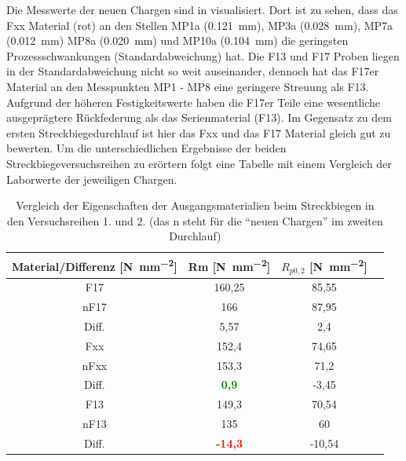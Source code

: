 \documentclass[12pt,a4paper,parskip]{scrartcl}
\begin{document}
Die Messwerte der neuen Chargen sind in  visualisiert. Dort ist zu sehen, dass das Fxx Material (rot) an den Stellen MP1a (\SI{0,121}{\milli\meter}), MP3a (\SI{0,028}{\milli\metre}),  MP7a (\SI{0,012}{\milli\meter}) MP8a (\SI{0,020}{\milli\meter}) und MP10a (\SI{0,104}{\milli\meter}) die geringsten Prozessschwankungen (Standardabweichung) hat.  Die F13 und F17 Proben liegen in der Standardabweichung nicht so weit auseinander, dennoch hat das F17er Material an den Messpunkten MP1 - MP8 eine geringere Streuung als F13. Aufgrund der höheren Festigkeitswerte haben die F17er Teile eine wesentliche ausgeprägtere Rückfederung als das Serienmaterial (F13). Im Gegensatz zu dem ersten Streckbiegedurchlauf ist hier das Fxx und das F17 Material gleich gut zu bewerten. Um die unterschiedlichen Ergebnisse der beiden Streckbiegeversuchsreihen zu erörtern folgt eine Tabelle mit einem Vergleich der Laborwerte der jeweiligen Chargen. 

\begin{table}[H]
\caption{Vergleich der Eigenschaften der  Ausgangsmaterialien beim Streckbiegen in den Versuchsreihen 1. und 2. (das n steht für die "`neuen Chargen"' im zweiten Durchlauf)}
\label{tab:altneu}
\centering
\begin{tabular}{cccc}
\toprule
Material/Differenz [\si{\newton\per\milli\meter\squared}] & Rm [\si{\newton\per\milli\meter\squared}]& $R_{p0,2}$ [\si{\newton\per\milli\meter\squared}] \\
\midrule
F17 & 160,25 & 85,55 \\
nF17 & 166 & 87,95 \\
Diff. & 5,57 & 2,4 \\
\midrule
Fxx & 152,4 & 74,65 \\
nFxx & 153,3 & 71,2 \\
Diff. & \textbf{\textcolor{green}{0,9}} & -3,45 \\
\midrule
F13 & 149,3 & 70,54 \\
nF13 & 135 & 60 \\
Diff. & \textbf{\textcolor{red}{-14,3}} & -10,54 \\
\bottomrule
\end{tabular}
\end{table}
\end{document}
